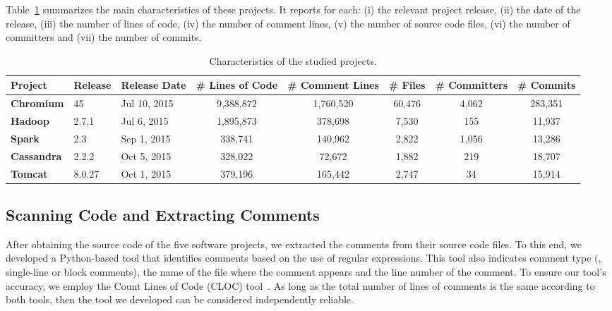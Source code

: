 Table~\ref{table:projects_statistics} summarizes the main characteristics of these projects. It reports for each: (i) the relevant project release, (ii) the date of the release, (iii) the number of lines of code, (iv)  the number of comment lines, (v)  the number of source code files, (vi)  the number of committers and (vii) the number of commits.

	
\begin{table}[t]


		\centering
		\caption{Characteristics of the studied projects.}
				\begin{adjustbox}{width=1.0\textwidth}
		\begin{tabular}{l|ll|ccccc}
			\hline
			\textbf{Project}  & \textbf{Release} & \textbf{ Release Date}  & \textbf{\# Lines of Code} & \textbf{\# Comment Lines} & \textbf{\# Files} & \textbf{\# Committers} & \textbf{\# Commits} \\ \hline
			\textbf{Chromium} &   45    & Jul 10, 2015 &  9,388,872   &    1,760,520    & 60,476 &    4,062    & 283,351  \\ \hline
			\textbf{Hadoop} &   2.7.1    & Jul 6, 2015 &  1,895,873   &    378,698    & 7,530 &    155    & 11,937  \\ \hline
			\textbf{Spark} &   2.3    & Sep 1, 2015 &  338,741   &    140,962    & 2,822 &    1,056    & 13,286  \\ \hline
			\textbf{Cassandra} &   2.2.2    & Oct 5, 2015 &  328,022   &    72,672    & 1,882 &    219    & 18,707  \\ \hline
			\textbf{Tomcat} &   8.0.27    & Oct 1, 2015 &  379,196   &    165,442    & 2,747 &    34    & 15,914  \\ \hline
		\end{tabular}
		\label{table:projects_statistics}
	\end{adjustbox}
\end{table}


\subsection{Scanning Code and Extracting Comments}
\label{ch3_scanningCodeAndExtracting}
After obtaining the source code of the five software projects, we extracted the comments from their source code files. To this end, we developed a Python-based tool that identifies comments based on the use of regular expressions. This tool also indicates comment type (\ie{}, single-line or block comments), the name of the file where the comment appears and the line number of the comment. To ensure our tool's accuracy, we employ the Count Lines of Code (CLOC) tool~\cite{cloc}. As long as the total number of lines of comments is the same according to both tools, then the tool we developed can be considered independently reliable.

